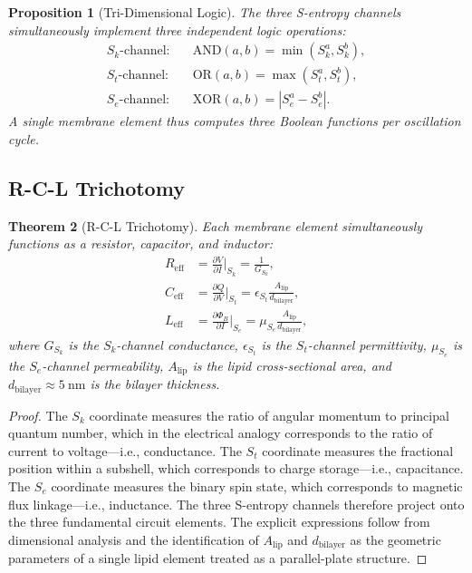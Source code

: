\documentclass[11pt,twocolumn,a4paper]{article}
\newtheorem{theorem}{Theorem}[section]
\newtheorem{proposition}[theorem]{Proposition}
\theoremstyle{definition}
\theoremstyle{remark}
\newcommand{\Sk}{S_{k}}
\newcommand{\St}{S_{t}}
\newcommand{\Se}{S_{e}}
\begin{document}
\begin{proposition}[Tri-Dimensional Logic]\label{prop:tri-logic}
The three S-entropy channels simultaneously implement three independent logic operations:
\begin{align}
    \Sk\text{-channel:} &\quad \mathrm{AND}(a, b) = \min(\Sk^a, \Sk^b), \label{eq:AND}\\
    \St\text{-channel:} &\quad \mathrm{OR}(a, b) = \max(\St^a, \St^b), \label{eq:OR}\\
    \Se\text{-channel:} &\quad \mathrm{XOR}(a, b) = |\Se^a - \Se^b|. \label{eq:XOR}
\end{align}
A single membrane element thus computes three Boolean functions per oscillation cycle.
\end{proposition}

\subsection{R-C-L Trichotomy}

\begin{theorem}[R-C-L Trichotomy]\label{thm:RCL}
Each membrane element simultaneously functions as a resistor, capacitor, and inductor:
\begin{align}
    R_{\mathrm{eff}} &= \frac{\partial V}{\partial I}\bigg|_{\Sk} = \frac{1}{G_{\Sk}}, \label{eq:R-eff}\\
    C_{\mathrm{eff}} &= \frac{\partial Q}{\partial V}\bigg|_{\St} = \epsilon_{\St} \frac{A_{\mathrm{lip}}}{d_{\mathrm{bilayer}}}, \label{eq:C-eff}\\
    L_{\mathrm{eff}} &= \frac{\partial \Phi_B}{\partial I}\bigg|_{\Se} = \mu_{\Se} \frac{A_{\mathrm{lip}}}{d_{\mathrm{bilayer}}}, \label{eq:L-eff}
\end{align}
where $G_{\Sk}$ is the $\Sk$-channel conductance, $\epsilon_{\St}$ is the $\St$-channel permittivity, $\mu_{\Se}$ is the $\Se$-channel permeability, $A_{\mathrm{lip}}$ is the lipid cross-sectional area, and $d_{\mathrm{bilayer}} \approx 5~\mathrm{nm}$ is the bilayer thickness.
\end{theorem}

\begin{proof}
The $\Sk$ coordinate measures the ratio of angular momentum to principal quantum number, which in the electrical analogy corresponds to the ratio of current to voltage---i.e., conductance.  The $\St$ coordinate measures the fractional position within a subshell, which corresponds to charge storage---i.e., capacitance.  The $\Se$ coordinate measures the binary spin state, which corresponds to magnetic flux linkage---i.e., inductance.  The three S-entropy channels therefore project onto the three fundamental circuit elements.  The explicit expressions follow from dimensional analysis and the identification of $A_{\mathrm{lip}}$ and $d_{\mathrm{bilayer}}$ as the geometric parameters of a single lipid element treated as a parallel-plate structure.
\end{proof}
\end{document}
